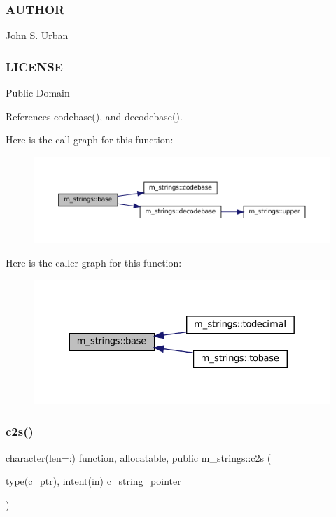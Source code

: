 \subsubsection*{A\+U\+T\+H\+OR}

John S. Urban \subsubsection*{L\+I\+C\+E\+N\+SE}

Public Domain 

References codebase(), and decodebase().

Here is the call graph for this function\+:\nopagebreak
\begin{figure}[H]
\begin{center}
\leavevmode
\includegraphics[width=350pt]{namespacem__strings_a635ef6f1dd73400e7b339392886d6357_cgraph}
\end{center}
\end{figure}
Here is the caller graph for this function\+:\nopagebreak
\begin{figure}[H]
\begin{center}
\leavevmode
\includegraphics[width=329pt]{namespacem__strings_a635ef6f1dd73400e7b339392886d6357_icgraph}
\end{center}
\end{figure}
\mbox{\label{namespacem__strings_a0a8c0c16a34208351523068686cb743b}} 
\subsubsection{\texorpdfstring{c2s()}{c2s()}}
{\footnotesize\ttfamily character(len=\+:) function, allocatable, public m\+\_\+strings\+::c2s (\begin{DoxyParamCaption}\item[{type(c\+\_\+ptr), intent(in)}]{c\+\_\+string\+\_\+pointer }\end{DoxyParamCaption})}



